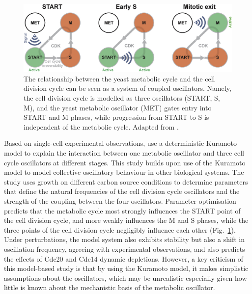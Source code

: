 \begin{figure}
  \centering
  \includegraphics[width=1.0\textwidth]{ozsezenInferenceHighLevelInteraction2019_7}
  \caption[
    The relationship between the yeast metabolic cycle and the cell division cycle can be seen as a system of coupled oscillators
  ]{
    The relationship between the yeast metabolic cycle and the cell division cycle can be seen as a system of coupled oscillators.
    Namely, the cell division cycle is modelled as three oscillators (START, S, M), and the yeast metabolic oscillator (MET) gates entry into START and M phases, while progression from START to S is independent of the metabolic cycle.
    Adapted from \textcite{ozsezenInferenceHighLevelInteraction2019}.}
  \label{fig:intro-ymc-coupled_oscillators}
\end{figure}

Based on single-cell experimental observations, \textcite{ozsezenInferenceHighLevelInteraction2019} use a deterministic Kuramoto model to explain the interaction between one metabolic oscillator and three cell cycle oscillators at different stages.
This study builds upon use of the Kuramoto model to model collective oscillatory behaviour in other biological systems.
The study uses growth on different carbon source conditions to determine parameters that define the natural frequencies of the cell division cycle oscillators and the strength of the coupling between the four oscillators.
Parameter optimisation predicts that the metabolic cycle most strongly influences the START point of the cell division cycle, and more weakly influences the M and S phases, while the three points of the cell division cycle negligibly influence each other (Fig.\ \ref{fig:intro-ymc-coupled_oscillators}).
Under perturbations, the model system also exhibits stability but also a shift in oscillation frequency, agreeing with experimental observations, and also predicts the effects of Cdc20 and Cdc14 dynamic depletions.
However, a key criticism of this model-based study is that by using the Kuramoto model, it makes simplistic assumptions about the oscillators, which may be unrealistic especially given how little is known about the mechanistic basis of the metabolic oscillator.

